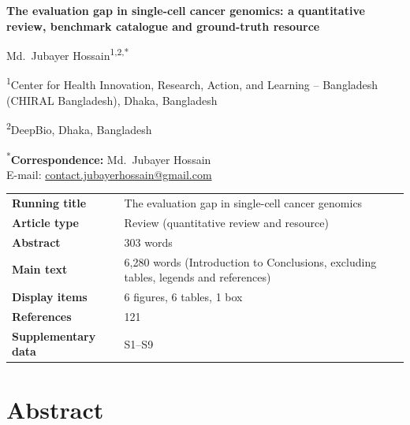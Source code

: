 \documentclass[11pt]{article}
\renewcommand{\arraystretch}{1.2}
\begin{document}
\begin{titlepage}
\thispagestyle{empty}
\begin{flushleft}
{\Large\bfseries{}
The evaluation gap in single-cell cancer genomics: a quantitative review, benchmark catalogue and ground-truth resource\par}
\vspace{2em}
{\large Md.\ Jubayer Hossain\textsuperscript{1,2,*}\par}
\vspace{1.2em}
{\small
\textsuperscript{1}Center for Health Innovation, Research, Action, and Learning -- Bangladesh (CHIRAL Bangladesh), Dhaka, Bangladesh\par
\textsuperscript{2}DeepBio, Dhaka, Bangladesh\par}
\vspace{1.5em}
{\small
\textsuperscript{*}\textbf{Correspondence:} Md.\ Jubayer Hossain\\
E-mail: \href{mailto:contact.jubayerhossain@gmail.com}{contact.jubayerhossain@gmail.com}\par}
\vspace{2.5em}
\renewcommand{\arraystretch}{1.3}
{\small
\begin{tabular}{@{}p{}p{}@{}}
\textbf{Running title} & The evaluation gap in single-cell cancer genomics\\
\textbf{Article type} & Review (quantitative review and resource)\\
\textbf{Abstract} & 303 words\\
\textbf{Main text} & 6,280 words (Introduction to Conclusions, excluding tables, legends and references)\\
\textbf{Display items} & 6 figures, 6 tables, 1 box\\
\textbf{References} & 121\\
\textbf{Supplementary data} & S1--S9\\
\end{tabular}}
\end{flushleft}
\end{titlepage}

\section{Abstract}\label{abstract}
\begingroup\setlength{\parindent}{0pt}\setlength{\parskip}{0.6ex}
\end{document}
